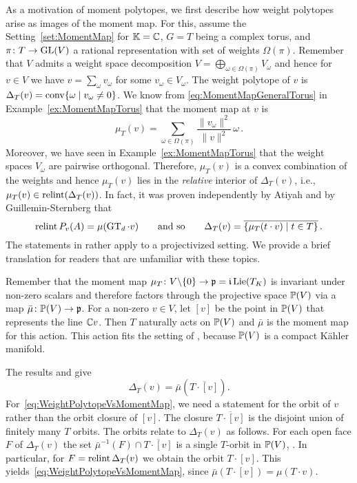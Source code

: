 As a motivation of moment polytopes, we first describe how weight polytopes arise as images of the moment map.
For this, assume the Setting~\ref{set:MomentMap} for $\mathbb K=\mathbb C$, $G = T$ being a complex torus, and $\pi \colon T \to \operatorname{GL}(V)$ a rational representation with set of weights $\Omega(\pi)$. Remember that $V$ admits a weight space decomposition $V = \bigoplus_{\omega \in \Omega(\pi)} V_\omega$ and hence for $v \in V$ we have $v = \sum_\omega v_\omega$ for some $v_\omega \in V_\omega$. The weight polytope of $v$ is $\Delta_T(v) = \operatorname{conv}\{ \omega \mid v_\omega \neq 0 \}$.
We know from \eqref{eq:MomentMapGeneralTorus} in Example~\ref{ex:MomentMapTorus} that the moment map at $v$ is
	\[ \mu_T(v) = \sum_{\omega \in \Omega(\pi)} \frac{\|v_\omega\|^2}{\|v\|^2} \, \omega \, . \]
Moreover, we have seen in Example~\ref{ex:MomentMapTorus} that the weight spaces $V_\omega$ are pairwise orthogonal. Therefore, $\mu_T(v)$ is a convex combination of the weights and hence $\mu_T(v)$ lies in the \emph{relative} interior of $\Delta_T(v)$, i.e., $\mu_T(v) \in \operatorname{relint}(\Delta_T(v))$. In fact, it was proven independently by Atiyah \cite[Theorem~2]{AtiyahConvexity} and by Guillemin-Sternberg \cite[Theorem~4]{GuilleminSternberg} that
\begin{equation}\label{eq:WeightPolytopeVsMomentMap} %
	\mathrm{relint}\, P_v(A) = \mu(\GT_d \cdot v) \qquad \text{and so} \qquad
	\Delta_{T}(v) = \overline{ \lbrace \mu_{T}(t \cdot v) \mid t \in T \rbrace } \, .
\end{equation}
The statements in \cite{AtiyahConvexity,GuilleminSternberg} rather apply to a projectivized setting. We provide a brief translation for readers that are unfamiliar with these topics.

\begin{remark} \label{rem:ProjectiveSetting}
	Remember that the moment map $\mu_T \colon V \backslash \{0\} \to \mathfrak{p} = \mathfrak{i} \operatorname{Lie}(T_K)$ is invariant under non-zero scalars and therefore factors through the projective space $\mathbb P(V)$ via a map $\bar{\mu} \colon \mathbb P(V) \to \mathfrak{p}$.
	For a non-zero $v \in V$, let $[v]$ be the point in $\mathbb P(V)$ that represents the line $\mathbb C v$. Then $T$ naturally acts on $\mathbb P(V)$ and $\bar{\mu}$ is the moment map for this action. This action fits the setting of \cite{AtiyahConvexity,GuilleminSternberg}, because $\mathbb P(V)$ is a compact K\"ahler manifold.
	
	The results \cite[Theorem~2]{AtiyahConvexity} and \cite[Theorem~4]{GuilleminSternberg} give
		\[ \Delta_T(v) = \bar{\mu} \left( \overline{T \cdot [v]} \right).\]
	For~\eqref{eq:WeightPolytopeVsMomentMap}, we need a statement for
	the orbit of $v$ rather than the orbit closure of $[v]$. The closure $\overline{T\cdot [v]}$ is the disjoint union of finitely many $T$ orbits. The orbits relate to $\Delta_T(v)$ as follows.  For each open face $F$ of $\Delta_T(v)$ the set $\bar{\mu}^{-1}(F) \cap \overline{T \cdot [v]}$ is a single $T$-orbit in $\mathbb P(V)$, \cite[Theorem~2]{AtiyahConvexity}. In particular, for $F = \operatorname{relint} \Delta_T(v)$ we obtain the orbit $T \cdot [v]$. This yields~\eqref{eq:WeightPolytopeVsMomentMap}, since $\bar{\mu}(T \cdot [v]) = \mu(T \cdot v)$.
	\hfill\remSymbol
\end{remark}

